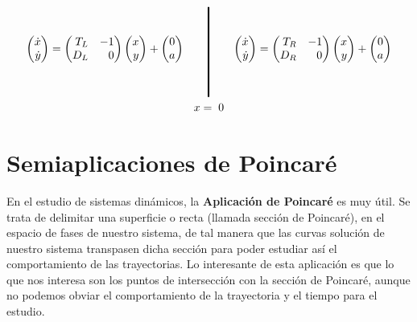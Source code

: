 \documentclass[12pt,a4paper]{report} %
\begin{document}
	\begin{equation}
		\label{eq:lienardrlgr}
		\begin{gathered}
			\begin{pmatrix*}[r]
				\dot{x}\\ \dot{y}
			\end{pmatrix*}= \begin{pmatrix*}[r]
				T_L & -1 \\ D_L & 0
			\end{pmatrix*} \begin{pmatrix*}[r]
				x \\ y
			\end{pmatrix*}+\begin{pmatrix*}[c]
				0 \\ a
			\end{pmatrix*} \qquad 
			\rule[-40pt]{1.5pt}{80pt} \qquad 
			\begin{pmatrix*}[r]
				\dot{x}\\ \dot{y}
			\end{pmatrix*}= \begin{pmatrix*}[r]
				T_R & -1 \\ D_R & 0
			\end{pmatrix*} \begin{pmatrix*}[r]
				x \\ y
			\end{pmatrix*}+\begin{pmatrix*}[c]
				0 \\ a
			\end{pmatrix*} \\ x=\;0
		\end{gathered}
	\end{equation}\smallskip
	
	\newpage
	
	\chapter{Semiaplicaciones de Poincaré}
	En el estudio de sistemas dinámicos, la \textbf{Aplicación de Poincaré} es muy útil. Se trata de delimitar una superficie o recta (llamada sección de Poincaré), en el espacio de fases de nuestro sistema, de tal manera que las curvas solución de nuestro sistema transpasen dicha sección para poder estudiar así el comportamiento de las trayectorias. Lo interesante de esta aplicación es que lo que nos interesa son los puntos de intersección con la sección de Poincaré, aunque no podemos obviar el comportamiento de la trayectoria y el tiempo para el estudio.\\[0.5cm]
	
\end{document}
